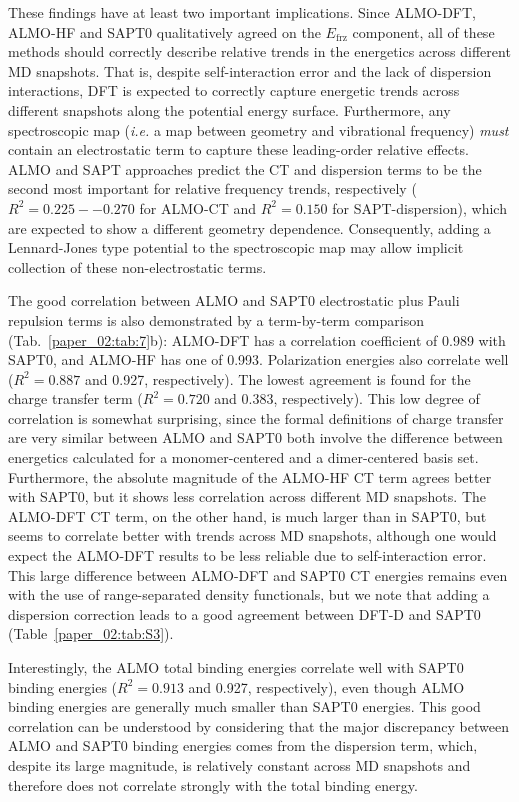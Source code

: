 These findings have at least two important implications. Since ALMO-DFT, ALMO-HF and SAPT0 qualitatively agreed on the \(E_{\text{frz}}\) component, all of these methods should correctly describe relative trends in the energetics across different MD snapshots. That is, despite self-interaction error and the lack of dispersion interactions, DFT is expected to correctly capture energetic trends across different snapshots along the potential energy surface. Furthermore, any spectroscopic map (\emph{i.e.} a map between  geometry and vibrational frequency) \emph{must} contain an electrostatic term to capture these leading-order relative effects. ALMO and SAPT approaches predict the CT and dispersion terms to be the second most important for relative frequency trends, respectively (\(R^2 = 0.225 -- 0.270\) for ALMO-CT and \(R^2 = 0.150\) for SAPT-dispersion), which are expected to show a different geometry dependence. Consequently, adding a Lennard-Jones type potential to the spectroscopic map may allow implicit collection of these non-electrostatic terms.

The good correlation between ALMO and SAPT0 electrostatic plus Pauli repulsion terms is also demonstrated by a term-by-term comparison (Tab.~\ref{paper_02:tab:7}b): ALMO-DFT has a correlation coefficient of \num{0.989} with SAPT0, and ALMO-HF has one of \num{0.993}. Polarization energies also correlate well (\(R^2 = 0.887\) and \num{0.927}, respectively). The lowest agreement is found for the charge transfer term (\(R^2 = 0.720\) and \num{0.383}, respectively). This low degree of correlation is somewhat surprising, since the formal definitions of charge transfer are very similar between ALMO and SAPT0 \textemdash{} both involve the difference between energetics calculated for a monomer-centered and a dimer-centered basis set. Furthermore, the absolute magnitude of the ALMO-HF CT term agrees better with SAPT0, but it shows less correlation across different MD snapshots. The ALMO-DFT CT term, on the other hand, is much larger than in SAPT0, but seems to correlate better with trends across MD snapshots, although one would expect the ALMO-DFT results to be less reliable due to self-interaction error. This large difference between ALMO-DFT and SAPT0 CT energies remains even with the use of range-separated density functionals, but we note that adding a dispersion correction leads to a good agreement between DFT-D and SAPT0 (Table~\ref{paper_02:tab:S3}).

Interestingly, the ALMO total binding energies correlate well with SAPT0 binding energies (\(R^2 = 0.913\) and \num{0.927}, respectively), even though ALMO binding energies are generally much smaller than SAPT0 energies. This good correlation can be understood by considering that the major discrepancy between ALMO and SAPT0 binding energies comes from the dispersion term, which, despite its large magnitude, is relatively constant across MD snapshots and therefore does not correlate strongly with the total binding energy.


